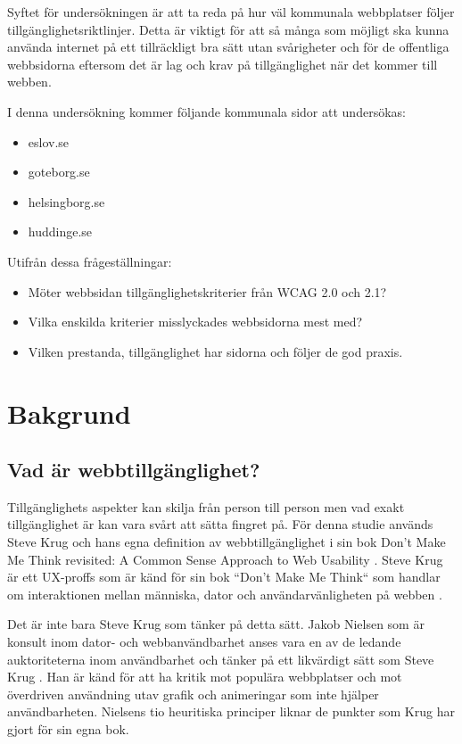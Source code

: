 \documentclass[11p]{article}
\begin{document}
    Syftet för undersökningen är att ta reda på hur väl kommunala webbplatser följer tillgänglighetsriktlinjer.
    Detta är viktigt för att så många som möjligt ska kunna använda internet på ett tillräckligt bra sätt utan svårigheter och för de offentliga webbsidorna eftersom det är lag och krav på tillgänglighet när det kommer till webben.

    I denna undersökning kommer följande kommunala sidor att undersökas:

    \begin{itemize}
        \item eslov.se
        \item goteborg.se
        \item helsingborg.se
        \item huddinge.se
    \end{itemize}

    Utifrån dessa frågeställningar:

    \begin{itemize}
        \item Möter webbsidan tillgänglighetskriterier från WCAG 2.0 och 2.1?
        \item Vilka enskilda kriterier misslyckades webbsidorna mest med?
        \item Vilken prestanda, tillgänglighet har sidorna och följer de god praxis.
    \end{itemize}
    
    \section{Bakgrund}
    
    \subsection{Vad är webbtillgänglighet?}
    Tillgänglighets aspekter kan skilja från person till person men vad exakt tillgänglighet är kan vara svårt att sätta fingret på.
    För denna studie används Steve Krug och hans egna definition av webbtillgänglighet i sin bok Don't Make Me Think revisited: A Common Sense Approach to Web Usability \textcite{Krug}.
    Steve Krug är ett UX-proffs som är känd för sin bok ``Don't Make Me Think`` som handlar om interaktionen mellan människa, dator och användarvänligheten på webben \textcite{Krug_Wikipedia}.

    Det är inte bara Steve Krug som tänker på detta sätt.
    Jakob Nielsen som är konsult inom dator- och webbanvändbarhet anses vara en av de ledande auktoriteterna inom användbarhet och tänker på ett likvärdigt sätt som Steve Krug \textcite{Jakob_Nielsen}.
    Han är känd för att ha kritik mot populära webbplatser och mot överdriven användning utav grafik och animeringar som inte hjälper användbarheten.
    Nielsens tio heuritiska principer liknar de punkter som Krug har gjort för sin egna bok.
\end{document}
